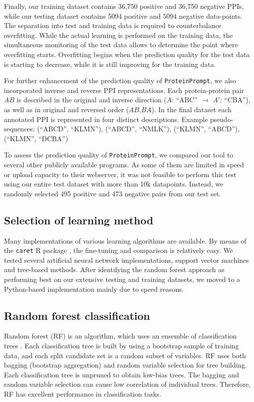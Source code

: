 \documentclass[3p,times,twocolumn]{elsarticle}
\newcommand{\tool}{\texttt{ProteinPrompt}}
\begin{document}
Finally, our training dataset contains 36,750 positive and 36,750
negative PPIs, while our testing dataset contains 5094 positive and
5094 negative data-points.
The separation into test and training data is required to counterbalance overfitting.
While the actual learning is performed on the training data,
the simultaneous monitoring of the test data allows to determine the point where overfitting starts.
Overfitting begins when the prediction quality for the test data is starting to decrease,
while it is still improving for the training data.

For further enhancement of the prediction
quality of \tool, we also incorporated inverse and reverse PPI
representations. Each protein-protein pair $AB$ is described in the
original and inverse direction ($A$: ``ABC'' $\rightarrow$ $A'$:  ``CBA''),
as well as in original and reversed order ($AB$,$BA$).
In the final dataset each annotated PPI is represented
in four distinct descriptions. Example pseudo-sequences: (``ABCD'', ``KLMN''),
  (``ABCD'', ``NMLK''), (``KLMN'', ``ABCD''), (``KLMN'', ``DCBA'')

To assess the prediction quality of \tool, we compared our tool to
several other publicly available programs. As some of them are limited
in speed or upload capacity to their webserver, it was not
feasible to perform this test using our entire test dataset with more
than 10k datapoints. Instead, we randomly selected 495 positive and 473
negative pairs from our test set.


\subsection{Selection of learning method}
Many implementations of various learning algorithms are
available. By means of the \texttt{caret} R package \cite{Kuhn:2008},
the fine-tuning and comparison is relatively easy. We tested several
artificial neural network implementations, support vector machines and
tree-based methods. After identifying the random forest approach as
performing best on our extensive testing and training datasets,
we moved to a Python-based implementation mainly
due to speed reasons.  


\subsection{Random forest classification}
Random forest (RF) is an algorithm, which uses an ensemble of
classification trees \cite{Breiman:2001}. Each classification tree is built by using a
bootstrap sample of training data, and each split candidate set is a
random subset of variables. RF uses both bagging (bootstrap
aggregation) and random variable selection for tree building. Each
classification tree is unpruned to obtain low-bias trees. The bagging
and random variable selection can cause low correlation of individual
trees. Therefore, RF has excellent performance in classification
tasks. 
\end{document}
